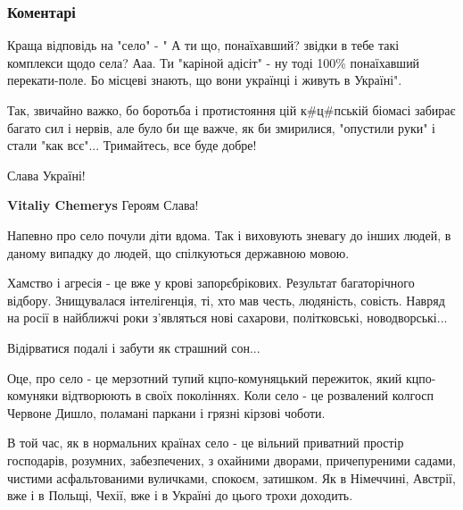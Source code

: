  
 
 
 
 
\subsubsection{Коментарі}

\begin{itemize} %

Краща відповідь на "село" - " А ти що, понаїхавший? звідки в тебе такі
комплекси щодо села? Ааа. Ти "каріной адісіт" - ну тоді 100\% понаїхавший
перекати-поле. Бо місцеві знають, що вони українці і живуть в Україні".


Так, звичайно важко, бо боротьба і протистояння цій к\#ц\#пській біомасі забирає
багато сил і нервів, але було би ще важче, як би змирилися, "опустили руки" і
стали "как всє"... Тримайтесь, все буде добре!

Слава Україні!

\begin{itemize} %
\textbf{Vitaliy Chemerys} Героям Слава!
\end{itemize} %

Напевно про село почули діти вдома. Так і виховують зневагу до інших людей, в даному випадку до людей, що спілкуються державною мовою.


Хамство і агресія - це вже у крові запорєбрікових. Результат багаторічного
відбору. Знищувалася інтелігенція, ті, хто мав честь, людяність, совість.
Навряд на росії в найближчі роки з'являться нові сахарови, політковські,
новодворські...

Відірватися подалі і забути як страшний сон...


Оце, про село - це мерзотний тупий кцпо-комуняцький пережиток, який
кцпо-комуняки відтворюють в своїх поколіннях. Коли село - це розвалений колгосп
Червоне Дишло, поламані паркани і грязні кірзові чоботи.

В той час, як в нормальних країнах село - це вільний приватний простір
господарів, розумних, забезпечених, з охайними дворами, причепуреними садами,
чистими асфальтованими вуличками, спокоєм, затишком. Як в Німеччині, Австрії,
вже і в Польщі, Чехії, вже і в Україні до цього трохи доходить.


\end{itemize}
